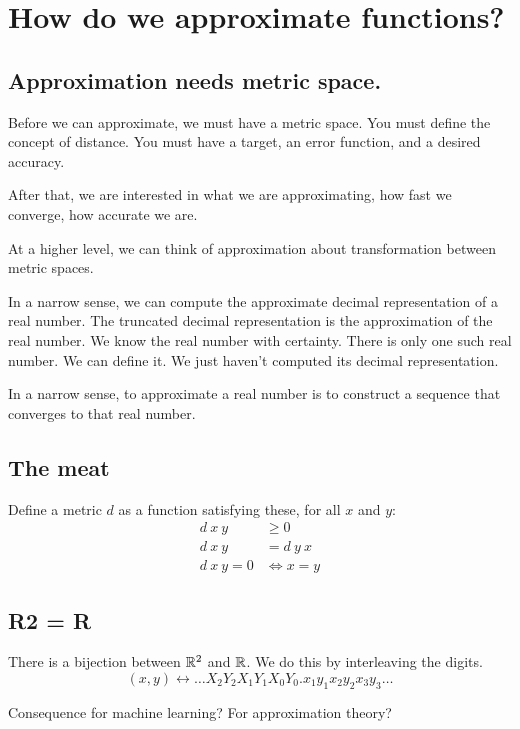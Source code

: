 \chapter{How do we approximate functions?}

\section{Approximation needs metric space.}

Before we can approximate, we must have a metric space.
You must define the concept of distance.
You must have a target, an error function, and a desired accuracy.

After that, we are interested in
what we are approximating, how fast we converge, how accurate we are.

At a higher level, we can think of approximation about
transformation between metric spaces.

In a narrow sense, we can compute the approximate decimal representation of a real number.
The truncated decimal representation is the approximation of the real number.
We know the real number with certainty.
There is only one such real number.
We can define it.
We just haven't computed its decimal representation.

In a narrow sense, to approximate a real number is
to construct a sequence that converges to that real number.

\section{The meat}

Define a metric \(d\) as a function satisfying these, for all \(x\) and \(y\):
\begin{align*}
    d~x~y &\ge 0
    \\
    d~x~y &= d~y~x
    \\
    d~x~y = 0 &\iff x=y
\end{align*}

\section{R2 = R}

There is a bijection between \(\mathbb{R}^2\) and \(\mathbb{R}\).
We do this by interleaving the digits.
\[
    (x, y) \leftrightarrow \ldots X_2 Y_2 X_1 Y_1 X_0 Y_0 . x_1 y_1 x_2 y_2 x_3 y_3 \ldots
\]

Consequence for machine learning? For approximation theory?

